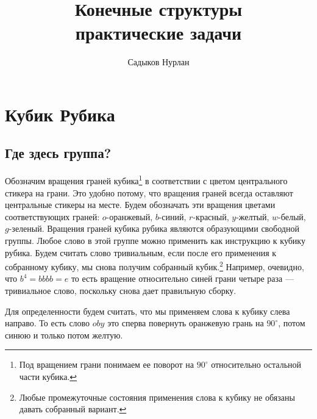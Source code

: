 \documentclass{tufte-book}
\title{Конечные структуры \\ {\Huge практические задачи}} %
\author{Садыков Нурлан}
\begin{document}
\frontmatter

\maketitle  
\section{Кубик Рубика}
\subsection{Где здесь группа?}

Обозначим вращения граней кубика\footnote{Под вращением грани понимаем ее
поворот на $90^\circ$ относительно остальной части кубика.} в соответствии с
цветом центрального стикера на грани. Это удобно потому, что вращения граней
всегда оставляют центральные стикеры на месте. Будем обозначать эти вращения
цветами соответствующих граней: $o$-оранжевый, $b$-синий, $r$-красный,
$y$-желтый, $w$-белый, $g$-зеленый. Вращения граней кубика рубика являются
образующими свободной группы. Любое слово в этой группе можно применить как
инструкцию к кубику рубика. Будем считать слово тривиальным, если после его
применения к собранному кубику, мы снова получим собранный
кубик.\footnote{Любые промежуточные состояния применения слова к кубику не
обязаны давать собранный вариант.} Например, очевидно, что $b^4 = bbbb = e$ то
есть вращение относительно синей грани четыре раза --- тривиальное слово,
поскольку снова дает правильную сборку.

Для определенности будем считать, что мы применяем слова к кубику слева
направо. То есть слово $oby$ это сперва повернуть оранжевую грань на
$90^\circ$, потом синюю и только потом желтую.
\end{document}
